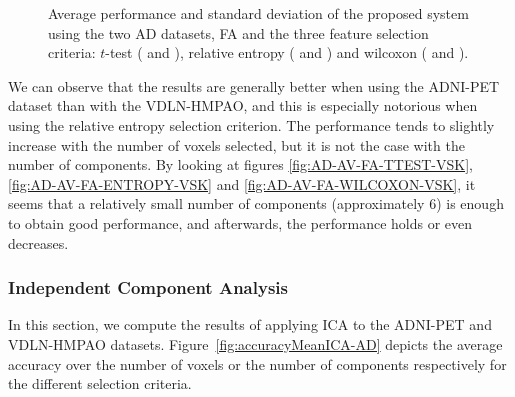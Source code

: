\begin{figure}
	
	\caption[Average performance of the \acs{AD} datasets in \acs{FA}.]{Average performance and standard deviation of the proposed system using the two \ac{AD} datasets, \ac{FA} and the three feature selection criteria: $t$-test (\protect{} and \protect{}), relative entropy (\protect{} and \protect{}) and wilcoxon (\protect{} and \protect{}). } 
	\label{fig:accuracyMeanFA-AD}
\end{figure}

We can observe that the results are generally better when using the ADNI-PET dataset than with the VDLN-HMPAO, and this is especially notorious when using the relative entropy selection criterion. The performance tends to slightly increase with the number of voxels selected, but it is not the case with the number of components. By looking at figures \ref{fig:AD-AV-FA-TTEST-VSK}, \ref{fig:AD-AV-FA-ENTROPY-VSK} and \ref{fig:AD-AV-FA-WILCOXON-VSK}, it seems that a relatively small number of components (approximately 6) is enough to obtain good performance, and afterwards, the performance holds or even decreases. 

\subsubsection{Independent Component Analysis}
In this section, we compute the results of applying \ac{ICA} to the ADNI-PET and VDLN-HMPAO datasets. Figure~\ref{fig:accuracyMeanICA-AD} depicts the average accuracy over the number of voxels or the number of components respectively for the different selection criteria. 


